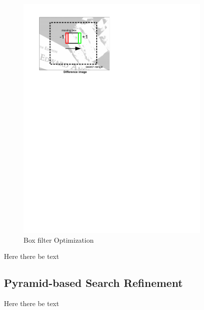 \begin{figure}[h]
\begin{center}
  \includegraphics[trim = 0in 8in 3.5in 0in, width=3.75in]{images/stereo/boxfilter.pdf}
\end{center}
  \caption{Box filter Optimization}
  \label{fig:box_filter}
\end{figure}

Here there be text

\subsection{Pyramid-based Search Refinement}

Here there be text


